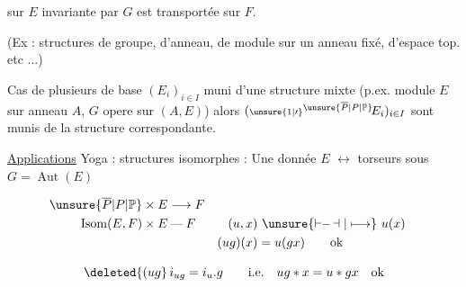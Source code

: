 sur $E$ invariante par $G$ est transportée sur $F$.

(Ex : structures de groupe, d'anneau, de module sur un anneau fixé, d'espace top. etc ...)

Cas de plusieurs  de base $(E_i)_{i\in I}$  muni d'une structure mixte (p.ex. module $E$ sur anneau $A$, $G$ opere sur $(A,E)$) alors $({\scriptstyle\unsure{1|\prime}}{}^{\unsure{\overline P|P|\mathbb P}}\!E_i)_{i\in I}$ sont munis de la structure correspondante.


\uline{Applications}\quad {} Yoga : structures isomorphes : Une  donnée $E$ $\longleftrightarrow$ torseurs sous $G=\operatorname{Aut}(E)$



\[
\begin{aligned}
\unsure{\overline P|P|\mathbb P}\times E&\longrightarrow F\\
\operatorname{Isom}(E,F)\times E&\mathbin{\text{---}} F
  & (u,x)&\ \unsure{\mathrel{\vdash\!\!-\!\dashv}|\longmapsto}\ u(x)\\
&& (ug)(x)&=u(gx)\qquad\text{ok}
\end{aligned}
\]


\[
\deleted{(ug}\,i_{ug}=i_u.g\qquad\text{i.e.}\quad ug*x=u*gx\quad\text{ok}
\]
